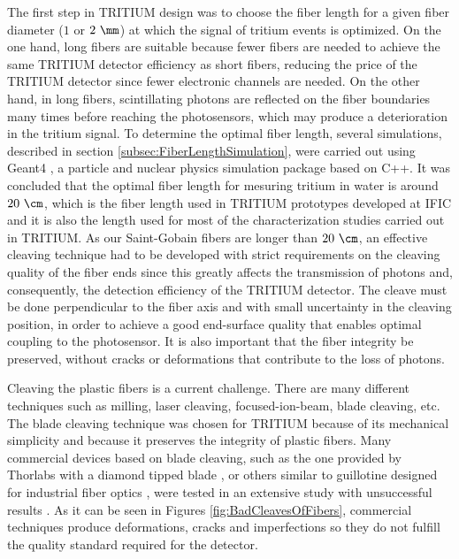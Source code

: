 The first step in TRITIUM design was to choose the fiber length for a given fiber diameter ($1$ or $2~\mm$) at which the signal of tritium events is optimized. On the one hand, long fibers are suitable because fewer fibers are needed to achieve the same TRITIUM detector efficiency as short fibers, reducing the price of the TRITIUM detector since fewer electronic channels are needed. On the other hand, in long fibers, scintillating photons are reflected on the fiber boundaries many times before reaching the photosensors, which may produce a deterioration in the tritium signal. To determine the optimal fiber length, several simulations, described in section \ref{subsec:FiberLengthSimulation}, were carried out using Geant4 \cite{Geant4WebPage}, a particle and nuclear physics simulation package based on C++. It was concluded that the optimal fiber length for mesuring tritium in water is around $20~\cm$, which is the fiber length used in TRITIUM prototypes developed at IFIC and it is also the length used for most of the characterization studies carried out in TRITIUM. As our Saint-Gobain fibers are longer than $20~\cm$, an effective cleaving technique had to be developed with strict requirements on the cleaving quality of the fiber ends since this greatly affects the transmission of photons and, consequently, the detection efficiency of the TRITIUM detector. The cleave must be done perpendicular to the fiber axis and with small uncertainty in the cleaving position, in order to achieve a good end-surface quality that enables optimal coupling to the photosensor. It is also important that the fiber integrity be preserved, without cracks or deformations that contribute to the loss of photons. 

Cleaving the plastic fibers is a current challenge. There are many different techniques such as milling, laser cleaving, focused-ion-beam, blade cleaving, etc. The blade cleaving technique was chosen for TRITIUM because of its mechanical simplicity and because it preserves the integrity of plastic fibers. Many commercial devices based on blade cleaving, such as the one provided by Thorlabs with a diamond tipped blade \cite{DiamondThorlabs}, or others similar to guillotine designed for industrial fiber optics \cite{GuillotineIFO}, were tested in an extensive study with unsuccessful results \cite{TFGAlberto}. As it can be seen in Figures \ref{fig:BadCleavesOfFibers}, commercial techniques produce deformations, cracks and imperfections so they do not fulfill the quality standard required for the detector.


